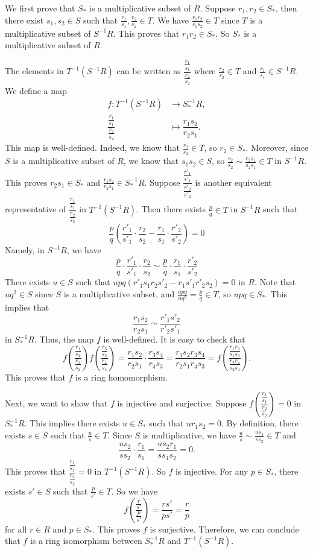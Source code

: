 \documentclass[a4paper, 12pt]{article}
\begin{document}
\begin{solution}
We first prove that \(S_*\) is a multiplicative subset of \(R\). Suppose \(r_1,r_2\in S_*\), then there exist \(s_1,s_2\in S\) such that \(\frac{r_1}{s_1},\frac{r_2}{s_2}\in T\). We have \(\frac{r_1r_2}{s_1s_2}\in T\) since \(T\) is a multiplicative subset of \(S^{-1}R\). This proves that \(r_1r_2\in S_*\). So \(S_*\) is a multiplicative subset of \(R\).

The elements in \(T^{-1}(S^{-1}R)\) can be written as \(\dfrac{\frac{r_1}{s_1}}{\frac{r_2}{s_2}}\) where \(\frac{r_2}{s_2}\in T\) and \(\frac{r_1}{s_1}\in S^{-1}R\). We define a map 
\begin{align*}
    f: T^{-1}(S^{-1}R)&\rightarrow S_*^{-1}R,\\
       \dfrac{\frac{r_1}{s_1}}{\frac{r_2}{s_2}}&\mapsto \dfrac{r_1s_2}{r_2s_1}.
\end{align*}
This map is well-defined. Indeed, we know that \(\frac{r_2}{s_2}\in T\), so \(r_2\in S_*\). Moreover, since \(S\) is a multiplicative subset of \(R\), we know that \(s_1s_2\in S\), so \(\frac{r_2}{s_2}\sim \frac{r_2s_1}{s_2s_1}\in T\) in \(S^{-1}R\). This proves \(r_2s_1\in S_*\) and \(\frac{r_1s_2}{r_2s_1}\in S_*^{-1}R\). Suppose \(\dfrac{\frac{r'_1}{s'_1}}{\frac{r'_2}{s'_2}}\) is another equivalent representative of \(\dfrac{\frac{r_1}{s_1}}{\frac{r_2}{s_2}}\) in \(T^{-1}(S^{-1}R)\). Then there exists \(\frac{p}{q}\in T\) in \(S^{-1}R\) such that  
\[\frac{p}{q}(\frac{r'_1}{s'_1}\cdot \frac{r_2}{s_2}-\frac{r_1}{s_1}\cdot\frac{r'_2}{s'_2})=0\]
Namely, in \(S^{-1}R\), we have 
\[\frac{p}{q}\cdot\frac{r'_1}{s'_1}\cdot \frac{r_2}{s_2}\sim \frac{p}{q}\cdot\frac{r_1}{s_1}\cdot\frac{r'_2}{s'_2}\]
There exists \(u\in S\) such that \(upq(r'_1s_1r_2s'_2-r_1s'_1r'_2s_2)=0\) in \(R\). Note that \(uq^2\in S\) since \(S\) is a multiplicative subset, and \(\frac{upq}{uq^2}=\frac{p}{q}\in T\), so \(upq\in S_*\). This implies that 
\[\frac{r_1s_2}{r_2s_1}\sim \frac{r'_1s'_2}{r'_2s'_1}\]
in \(S_*^{-1}R\). Thus, the map \(f\) is well-defined. It is easy to check that 
\[f(\dfrac{\frac{r_1}{s_1}}{\frac{r_2}{s_2}})f(\dfrac{\frac{r_3}{s_3}}{\frac{r_4}{s_4}})=\frac{r_1s_2}{r_2s_1}\cdot \frac{r_3s_4}{r_4s_3}=\frac{r_1s_2r_3s_4}{r_2s_1r_4s_3}=f(\dfrac{\frac{r_1r_3}{s_1s_3}}{\frac{r_2r_4}{s_2s_4}}).\]
This proves that \(f\) is a ring homomorphism.

Next, we want to show that \(f\) is injective and surjective. Suppose \(f(\dfrac{\frac{r_1}{s_1}}{\frac{r_2}{s_2}})=0\) in \(S_*^{-1}R\). This implies there exists \(u\in S_*\) such that \(ur_1s_2=0\). By definition, there exists \(s\in S\) such that \(\frac{u}{s}\in T\). Since \(S\) is multiplicative, we have \(\frac{u}{s}\sim \frac{us_2}{ss_2}\in T\) and 
\[\frac{us_2}{ss_2}\cdot \frac{r_1}{s_1}=\frac{us_2r_1}{ss_1s_2}=0.\]
This proves that \(\dfrac{\frac{r_1}{s_1}}{\frac{r_2}{s_2}}=0\) in \(T^{-1}(S^{-1}R)\). So \(f\) is injective. For any \(p\in S_*\), there exists \(s'\in S\) such that \(\frac{p}{s'}\in T\). So we have 
\[f(\dfrac{\frac{r}{s'}}{\frac{p}{s'}})=\frac{rs'}{ps'}=\frac{r}{p}\]
for all \(r\in R\) and \(p\in S_*\). This proves \(f\) is surjective. Therefore, we can conclude that \(f\) is a ring isomorphism between \(S_*^{-1}R\) and \(T^{-1}(S^{-1}R)\).
\end{solution}
\end{document}
